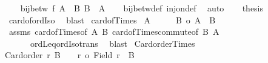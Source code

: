 \begin{isabellebody}
\ \ \isamarkupfalse%
\ {\isachardoublequoteopen}bij{\isacharunderscore}{\kern0pt}betw\ {\isacharquery}{\kern0pt}f\ {\isacharparenleft}{\kern0pt}A\ {\isasymtimes}\ B{\isacharparenright}{\kern0pt}\ {\isacharparenleft}{\kern0pt}B\ {\isasymtimes}\ A{\isacharparenright}{\kern0pt}{\isachardoublequoteclose}\isanewline
\ \ \isamarkupfalse%
\ bij{\isacharunderscore}{\kern0pt}betw{\isacharunderscore}{\kern0pt}def\ inj{\isacharunderscore}{\kern0pt}on{\isacharunderscore}{\kern0pt}def\ \isamarkupfalse%
\ auto\isanewline
\ \ \isamarkupfalse%
\ {\isacharquery}{\kern0pt}thesis\ \isamarkupfalse%
\ card{\isacharunderscore}{\kern0pt}of{\isacharunderscore}{\kern0pt}ordIso\ \isamarkupfalse%
\ blast\isanewline
{}\isamarkupfalse%
%
\endisatagproof
{\isafoldproof}%
%
\isadelimproof
\isanewline
%
\endisadelimproof
\isanewline
{}\isamarkupfalse%
\ card{\isacharunderscore}{\kern0pt}of{\isacharunderscore}{\kern0pt}Times{}{\isacharcolon}{\kern0pt}\isanewline
{}\ {\isachardoublequoteopen}A\ {\isasymnoteq}\ {\isacharbraceleft}{\kern0pt}{\isacharbraceright}{\kern0pt}{\isachardoublequoteclose}\ \ \ \ {\isachardoublequoteopen}{\isacharbar}{\kern0pt}B{\isacharbar}{\kern0pt}\ {\isasymle}o\ {\isacharbar}{\kern0pt}A\ {\isasymtimes}\ B{\isacharbar}{\kern0pt}{\isachardoublequoteclose}\isanewline
%
\isadelimproof
%
\endisadelimproof
%
\isatagproof
{}\isamarkupfalse%
\ assms\ card{\isacharunderscore}{\kern0pt}of{\isacharunderscore}{\kern0pt}Times{}{\isacharbrackleft}{\kern0pt}of\ A\ B{\isacharbrackright}{\kern0pt}\ card{\isacharunderscore}{\kern0pt}of{\isacharunderscore}{\kern0pt}Times{\isacharunderscore}{\kern0pt}commute{\isacharbrackleft}{\kern0pt}of\ B\ A{\isacharbrackright}{\kern0pt}\isanewline
\ \ \ \ \ \ ordLeq{\isacharunderscore}{\kern0pt}ordIso{\isacharunderscore}{\kern0pt}trans\ \isamarkupfalse%
\ blast%
\endisatagproof
{\isafoldproof}%
%
\isadelimproof
\isanewline
%
\endisadelimproof
\isanewline
{}\isamarkupfalse%
\ Card{\isacharunderscore}{\kern0pt}order{\isacharunderscore}{\kern0pt}Times{}{\isacharcolon}{\kern0pt}\isanewline
{\isachardoublequoteopen}{\isasymlbrakk}Card{\isacharunderscore}{\kern0pt}order\ r{\isacharsemicolon}{\kern0pt}\ B\ {\isasymnoteq}\ {\isacharbraceleft}{\kern0pt}{\isacharbraceright}{\kern0pt}{\isasymrbrakk}\ {\isasymLongrightarrow}\ r\ {\isasymle}o\ {\isacharbar}{\kern0pt}{\isacharparenleft}{\kern0pt}Field\ r{\isacharparenright}{\kern0pt}\ {\isasymtimes}\ B{\isacharbar}{\kern0pt}{\isachardoublequoteclose}\isanewline

\end{isabellebody}
